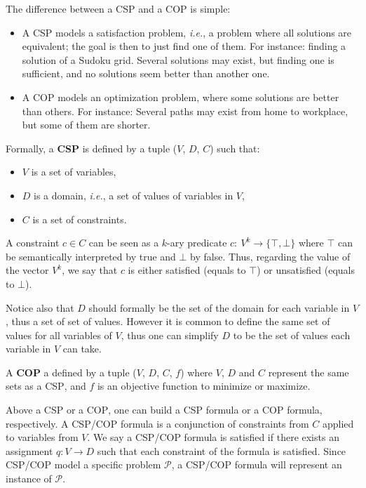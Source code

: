 \documentclass[journal]{IEEEtran}
\newcommand{\csp}{\textsc{CSP}\xspace}
\newcommand{\cop}{\textsc{COP}\xspace}
\newcommand{\ie}{\textit{i.e.}}
\begin{document}
The difference between a \csp and a \cop is simple:

\begin{itemize}
\item A \csp  models a satisfaction problem, \ie, a  problem where all
  solutions  are equivalent;  the goal  is then  to just  find one  of
  them. For  instance: finding  a solution of  a Sudoku  grid. Several
  solutions may exist, but finding one is sufficient, and no solutions
  seem better than another one.
\item A \cop models an  optimization problem, where some solutions are
  better than others.  For instance: Several paths may exist from home
  to workplace, but some of them are shorter.
\end{itemize}

Formally, a {\bf \csp} is defined by a tuple ($V$, $D$, $C$) such that:
\begin{itemize}
\item $V$ is a set of variables,
\item $D$ is a domain, \ie, a set of values of variables in $V$,
\item $C$ is a set of constraints.
\end{itemize}

A  constraint  $c   \in  C$  can  be  seen  as   a  $k$-ary  predicate
$c:~V^k\rightarrow\{\top,\bot\}$ where $\top$ can be semantically
interpreted by true and $\bot$ by  false. Thus, regarding the value of
the  vector $V^k$,  we say  that $c$  is either  satisfied (equals  to
$\top$) or unsatisfied (equals to $\bot$).

Notice also that $D$ should formally be the set of the domain for each
variable in $V$, thus a set of  set of values. However it is common to
define the same set  of values for all variables of  $V$, thus one can
simplify $D$ to be the set of values each variable in $V$ can take.

A {\bf \cop} a defined by a tuple ($V$, $D$, $C$, $f$) where $V$, $D$ and
$C$  represent the  same  sets as  a  \csp, and  $f$  is an  objective
function to minimize  or maximize.

Above  a \csp  or a  \cop, one  can  build a  \csp formula  or a  \cop
formula,  respectively.   A  \csp/\cop  formula is  a  conjunction  of
constraints from $C$ applied to variables from $V$. We say a \csp/\cop
formula is satisfied  if there exists an assignment  $q: V \rightarrow
D$  such that  each constraint  of  the formula  is satisfied.   Since
\csp/\cop model a specific  problem $\mathcal{P}$, a \csp/\cop formula
will represent an instance of $\mathcal{P}$.
\end{document}
